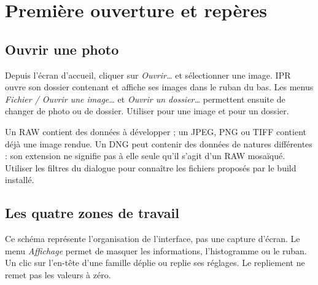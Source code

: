 \chapter{Première ouverture et repères}
\label{chap:demarrage}
\section{Ouvrir une photo}
Depuis l’écran d’accueil, cliquer sur \emph{Ouvrir…} et sélectionner une image.
IPR ouvre son dossier contenant et affiche ses images dans le ruban du bas.
Les menus \emph{Fichier / Ouvrir une image…} et \emph{Ouvrir un dossier…}
permettent ensuite de changer de photo ou de dossier. Utiliser
 pour une image et  pour un dossier.

Un RAW contient des données à développer ; un JPEG, PNG ou TIFF contient déjà
une image rendue. Un DNG peut contenir des données de natures différentes :
son extension ne signifie pas à elle seule qu’il s’agit d’un RAW mosaïqué.
Utiliser les filtres du dialogue pour connaître les fichiers proposés par le build installé.

\section{Les quatre zones de travail}
\begin{center}
\end{center}
Ce schéma représente l’organisation de l’interface, pas une capture d’écran.
Le menu \emph{Affichage} permet de masquer les informations, l’histogramme
ou le ruban. Un clic sur l’en-tête d’une famille déplie ou replie ses réglages.
Le repliement ne remet pas les valeurs à zéro.

